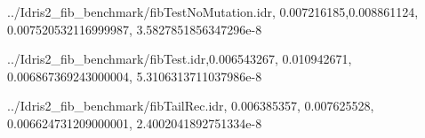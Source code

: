 \documentclass[
]{article}
\newenvironment{Shaded}{}{}
\newcommand{\DataTypeTok}[1]{\textcolor[rgb]{0.56,0.13,0.00}{#1}}
\newcommand{\FloatTok}[1]{\textcolor[rgb]{0.25,0.63,0.44}{#1}}
\newcommand{\NormalTok}[1]{#1}
\newcommand{\OperatorTok}[1]{\textcolor[rgb]{0.40,0.40,0.40}{#1}}
\begin{document}
\begin{Shaded}
\begin{Highlighting}[]
\OperatorTok{../}\DataTypeTok{Idris2\_fib\_benchmark}\OperatorTok{/}\NormalTok{fibTestNoMutation}\OperatorTok{.}\NormalTok{idr,}
\FloatTok{0.007216185}\NormalTok{,}\FloatTok{0.008861124}\NormalTok{,}
\FloatTok{0.007520532116999987}\NormalTok{,}
\FloatTok{3.5827851856347296e{-}8}

\OperatorTok{../}\DataTypeTok{Idris2\_fib\_benchmark}\OperatorTok{/}\NormalTok{fibTest}\OperatorTok{.}\NormalTok{idr,}\FloatTok{0.006543267}\NormalTok{,}
\FloatTok{0.010942671}\NormalTok{,}
\FloatTok{0.006867369243000004}\NormalTok{,}
\FloatTok{5.3106313711037986e{-}8}

\OperatorTok{../}\DataTypeTok{Idris2\_fib\_benchmark}\OperatorTok{/}\NormalTok{fibTailRec}\OperatorTok{.}\NormalTok{idr,}
\FloatTok{0.006385357}\NormalTok{,}
\FloatTok{0.007625528}\NormalTok{,}
\FloatTok{0.006624731209000001}\NormalTok{,}
\FloatTok{2.4002041892751334e{-}8}


\end{Highlighting}
\end{Shaded}
\end{document}
